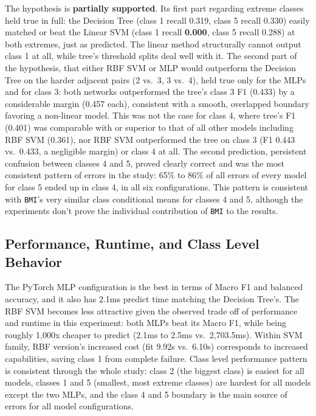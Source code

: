 \documentclass[conference]{IEEEtran}
\begin{document}
The hypothesis is \textbf{partially supported}. Its first part regarding extreme classes held true in full: the Decision Tree (class 1 recall 0.319, class 5 recall 0.330) easily matched or beat the Linear SVM (class 1 recall \textbf{0.000}, class 5 recall 0.288) at both extremes, just as predicted. The linear method structurally cannot output class 1 at all, while tree's threshold splits deal well with it. The second part of the hypothesis, that either RBF SVM or MLP would outperform the Decision Tree on the harder adjacent pairs (2 vs.\ 3, 3 vs.\ 4), held true only for the MLPs and for class 3: both networks outperformed the tree's class 3 F1 (0.433) by a considerable margin (0.457 each), consistent with a smooth, overlapped boundary favoring a non-linear model. This was not the case for class 4, where tree's F1 (0.401) was comparable with or superior to that of all other models including RBF SVM (0.361), nor RBF SVM outperformed the tree on class 3 (F1 0.443 vs.\ 0.433, a negligible margin) or class 4 at all. The second prediction, persistent confusion between classes 4 and 5, proved clearly correct and was the most consistent pattern of errors in the study: 65\% to 86\% of all errors of every model for class 5 ended up in class 4, in all six configurations. This pattern is consistent with \texttt{BMI}'s very similar class conditional means for classes 4 and 5, although the experiments don't prove the individual contribution of \texttt{BMI} to the results.

\subsection{Performance, Runtime, and Class Level Behavior}

The PyTorch MLP configuration is the best in terms of Macro F1 and balanced accuracy, and it also has 2.1ms predict time matching the Decision Tree's. The RBF SVM becomes less attractive given the observed trade off of performance and runtime in this experiment: both MLPs beat its Macro F1, while being roughly 1,000x cheaper to predict (2.1ms to 2.5ms vs.\ 2{,}703.5ms). Within SVM family, RBF version's increased cost (fit 9.92s vs.\ 6.10s) corresponds to increased capabilities, saving class 1 from complete failure. Class level performance pattern is consistent through the whole study: class 2 (the biggest class) is easiest for all models, classes 1 and 5 (smallest, most extreme classes) are hardest for all models except the two MLPs, and the class 4 and 5 boundary is the main source of errors for all model configurations.
\end{document}
